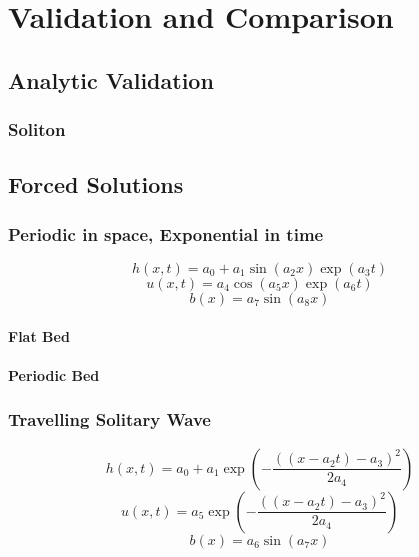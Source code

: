 
\chapter{Validation and Comparison}
\label{chp:NumMethodComp}

\section{Analytic Validation}

\subsection{Soliton}

\section{Forced Solutions}

\subsection{Periodic in space, Exponential in time}
\begin{equation}
h(x,t) = a_0 + a_1\sin\left(a_2 x\right)\exp\left(a_3 t\right)
\end{equation}
\begin{equation}
u(x,t) = a_4\cos\left(a_5 x\right)\exp\left(a_6 t\right)
\end{equation}
\begin{equation}
b(x) = a_7\sin\left(a_8 x\right)
\end{equation}










\subsubsection{Flat Bed}
\subsubsection{Periodic Bed}

\subsection{Travelling Solitary Wave}
\begin{equation}
h(x,t) = a_0 + a_1\exp\left(-\dfrac{ \left(\left(x - a_2t\right) - a_3 \right)^2}{2a_4}\right)
\end{equation}
\begin{equation}
u(x,t) = a_5\exp\left(-\dfrac{ \left(\left(x - a_2t\right) - a_3 \right)^2}{2a_4}\right)
\end{equation}
\begin{equation}
b(x) = a_6\sin\left(a_7 x\right)
\end{equation}

